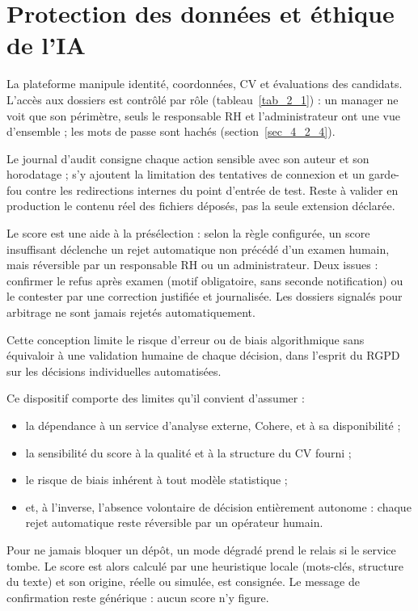 \documentclass[]{./tpl/isipfe}
\begin{document}
\section{Protection des données et éthique de l’IA}
\label{sec_4_6}
La plateforme manipule identité, coordonnées, CV et évaluations des candidats. L’accès aux dossiers est contrôlé par rôle (tableau~\ref{tab_2_1}) : un manager ne voit que son périmètre, seuls le responsable RH et l’administrateur ont une vue d’ensemble ; les mots de passe sont hachés (section~\ref{sec_4_2_4}).

Le journal d’audit consigne chaque action sensible avec son auteur et son horodatage ; s’y ajoutent la limitation des tentatives de connexion et un garde-fou contre les redirections internes du point d’entrée de test. Reste à valider en production le contenu réel des fichiers déposés, pas la seule extension déclarée.

Le score est une aide à la présélection : selon la règle configurée, un score insuffisant déclenche un rejet automatique non précédé d’un examen humain, mais réversible par un responsable RH ou un administrateur. Deux issues : confirmer le refus après examen (motif obligatoire, sans seconde notification) ou le contester par une correction justifiée et journalisée. Les dossiers signalés pour arbitrage ne sont jamais rejetés automatiquement.

Cette conception limite le risque d’erreur ou de biais algorithmique sans équivaloir à une validation humaine de chaque décision, dans l’esprit du RGPD \cite{ref17,ref18} sur les décisions individuelles automatisées.

Ce dispositif comporte des limites qu’il convient d’assumer :
\begin{itemize}
\item la dépendance à un service d’analyse externe, Cohere, et à sa disponibilité ;
\item la sensibilité du score à la qualité et à la structure du CV fourni ;
\item le risque de biais inhérent à tout modèle statistique ;
\item et, à l’inverse, l’absence volontaire de décision entièrement autonome : chaque rejet automatique reste réversible par un opérateur humain.
\end{itemize}
Pour ne jamais bloquer un dépôt, un mode dégradé prend le relais si le service tombe. Le score est alors calculé par une heuristique locale (mots-clés, structure du texte) et son origine, réelle ou simulée, est consignée. Le message de confirmation reste générique : aucun score n’y figure.
\end{document}
